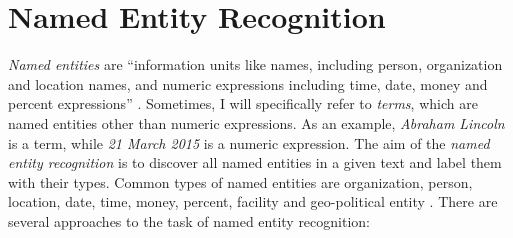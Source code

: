 \documentclass[12pt, twoside]{fithesis2}
\renewcommand{\_}{\leavevmode \kern0.07em\vbox{\hrule width0.4em}}
\begin{document}



\section{Named Entity Recognition}
\label{sec:terms-extraction}
\textit{Named entities}
are ``information units like names, including person, organization and location names, and numeric expressions including time, date, money and percent expressions'' \autocite{named-entity-recognition}.
Sometimes, I will specifically refer to \textit{terms}, which are named entities other than numeric expressions.
As an example, \textit{Abraham Lincoln} is a term, while \textit{21 March 2015} is a numeric expression.
The aim of the \textit{named entity recognition} is to discover all named entities in a given text and label them with their types. Common types of named entities are organization, person, location, date, time, money, percent, facility and geo-political entity \cite[][281]{nlp-python}. There are several approaches to the task of named entity recognition:
\end{document}
